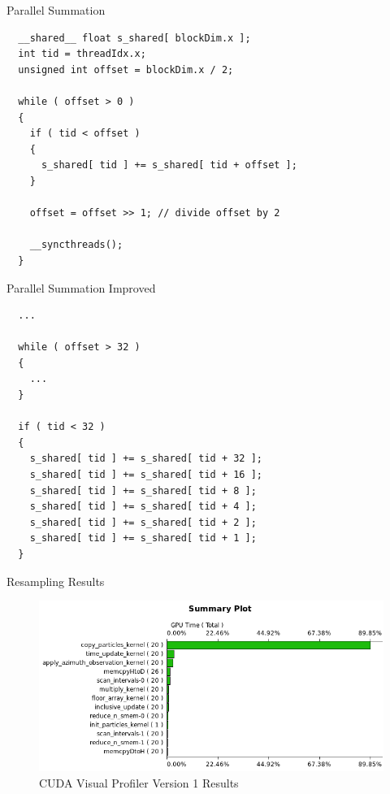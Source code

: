 \documentclass{beamer}
\begin{document}

\begin{frame}[containsverbatim]{Parallel Summation}


 \begin{verbatim}
  __shared__ float s_shared[ blockDim.x ];
  int tid = threadIdx.x;
  unsigned int offset = blockDim.x / 2;

  while ( offset > 0 )
  {
    if ( tid < offset )
    {
      s_shared[ tid ] += s_shared[ tid + offset ];
    }

    offset = offset >> 1; // divide offset by 2

    __syncthreads();
  }
 \end{verbatim}

\end{frame}


\begin{frame}[containsverbatim]{Parallel Summation Improved}

 \begin{verbatim}
  ...

  while ( offset > 32 )
  {
    ...
  }

  if ( tid < 32 )
  {
    s_shared[ tid ] += s_shared[ tid + 32 ];
    s_shared[ tid ] += s_shared[ tid + 16 ];
    s_shared[ tid ] += s_shared[ tid + 8 ];
    s_shared[ tid ] += s_shared[ tid + 4 ];
    s_shared[ tid ] += s_shared[ tid + 2 ];
    s_shared[ tid ] += s_shared[ tid + 1 ];
  }

 \end{verbatim}

\end{frame}


\begin{frame}{Resampling Results}

\begin{figure}
\centering
\includegraphics[width=1.0\textwidth]{data/profile_cuda_version1_pic1.png}
\caption{CUDA Visual Profiler Version 1 Results}
\end{figure}

\end{frame}
\end{document}
